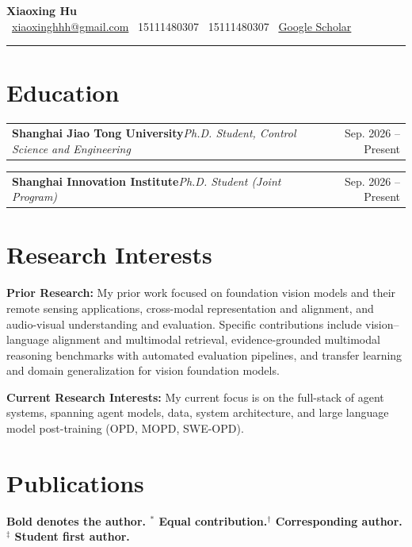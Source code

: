 \documentclass[a4paper,10.5pt]{article}
\makeatletter
\let\oldSection\section
\renewcommand{\section}[1]{\needspace{5\baselineskip}\oldSection{#1}}
\newcommand{\entry}[4]{%
  \begin{tabularx}{\textwidth}{@{}X r@{}}
    {\bfseries #1}\hfill{\itshape\color{muted}#2} & {\small\color{muted}#3}
  \end{tabularx}%
  \par\vspace{1.5pt}%
  \if\relax\detokenize{#4}\relax\else{\small #4}\par\fi
  \vspace{0.55em}%
}
\makeatother
\begin{document}
\begin{center}
  {\fontsize{22}{26}\selectfont\bfseries Xiaoxing Hu}\\[6pt]
  {\small
    \faEnvelope\ \href{mailto:xiaoxinghhh@gmail.com}{xiaoxinghhh@gmail.com}\quad
    \faPhone\ 15111480307\quad
    \faWeixin\ 15111480307\quad
    \faGoogle\ \href{https://scholar.google.com/citations?user=zBM8_XkAAAAJ&hl=zh-CN}{Google Scholar}
  }
\end{center}

\vspace{-0.35em}
{\color{rule}\rule{\textwidth}{0.6pt}}

\section{Education}

\entry{Shanghai Jiao Tong University}{Ph.D. Student, Control Science and Engineering}{Sep. 2026 -- Present}
  {}

\entry{Shanghai Innovation Institute}{Ph.D. Student (Joint Program)}{Sep. 2026 -- Present}
  {}

\section{Research Interests}

{\bfseries Prior Research:} My prior work focused on foundation vision models and their remote sensing applications, cross-modal representation and alignment, and audio-visual understanding and evaluation. Specific contributions include vision--language alignment and multimodal retrieval, evidence-grounded multimodal reasoning benchmarks with automated evaluation pipelines, and transfer learning and domain generalization for vision foundation models.

\vspace{0.45em}
{\bfseries Current Research Interests:} My current focus is on the full-stack of agent systems, spanning agent models, data, system architecture, and large language model post-training (OPD, MOPD, SWE-OPD).

\section{Publications}
{\bfseries\footnotesize\color{muted}Bold denotes the author.\quad
 $^{*}$ Equal contribution.\quad $^{\dagger}$ Corresponding author.\quad $^{\ddagger}$ Student first author.\par}
\vspace{0.2em}
\end{document}
